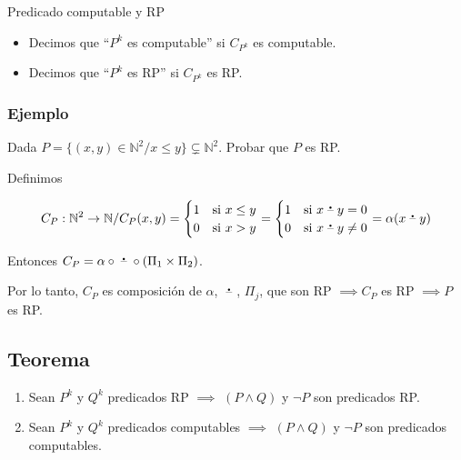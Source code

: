 \medskip

\begin{definicion}{Predicado computable y RP}{}
    \begin{itemize}
        \item Decimos que ``$P^k$ es computable'' si 
            $C_{P^k}$ es computable.
        \item Decimos que ``$P^k$ es RP'' si 
            $C_{P^k}$ es RP.
    \end{itemize}

\end{definicion}

\subsubsection{Ejemplo}

Dada $P = \{ (x,y) \in \mathbb{N}^2 / x \leq y \} \subsetneq \mathbb{N}^2$.
Probar que $P$ es RP.

Definimos

\begin{gather*}
    C_{P}: \mathbb{N}^2 \to \mathbb{N} / C_{P} (x,y) =
    \begin{cases}
        1 & \text{si } x \leq y \\
        0 & \text{si } x > y
    \end{cases} =
    \begin{cases}
        1 & \text{si } x \;\accentset{\mbox{\large\bfseries .}}{\text{--}}\; y  = 0\\
        0 & \text{si } x \;\accentset{\mbox{\large\bfseries .}}{\text{--}}\; y \neq 0
    \end{cases} = \alpha(x \;\accentset{\mbox{\large\bfseries .}}{\text{--}}\; y)
\end{gather*}

%
Entonces $C_{P} 
= \alpha \circ \;\accentset{\mbox{\large\bfseries .}}{\text{--}}\; \circ (\Pi_1 \times \Pi_2)$.

Por lo tanto, $C_{P}$ es composición de $\alpha$, $\;\accentset{\mbox{\large\bfseries .}}{\text{--}}\;$,
$\Pi_j$, que son RP $\implies C_{P}$ es RP $\implies P$ es
RP.

\subsection{Teorema}

\begin{teorema}{}{}
    \begin{enumerate}
        \item Sean $P^k$ y ${Q}^k$ predicados RP $\implies$
            $(P \wedge Q)$ y $\neg P$ son predicados RP.
        \item Sean ${P}^k$ y ${Q}^k$ predicados computables
            $\implies$ $(P \wedge Q)$ y $\neg P$ son predicados computables.
    \end{enumerate}
\end{teorema}

